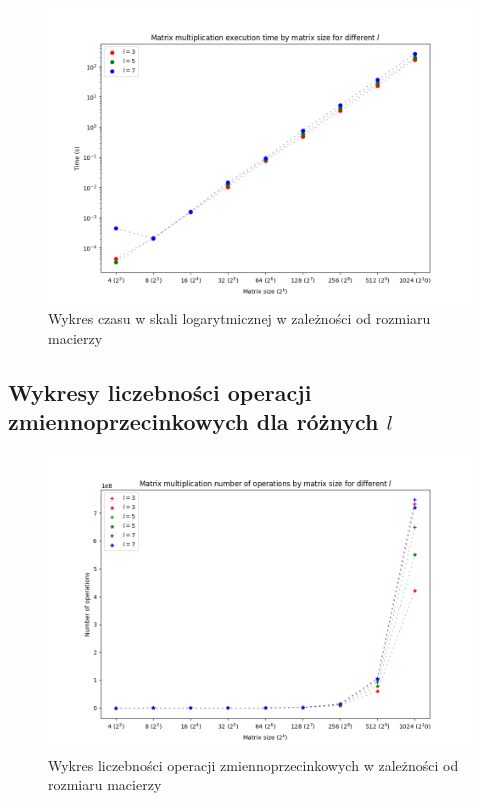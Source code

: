 \documentclass{article}
\begin{document}
\begin{figure}[h]
  \centering
  \includegraphics[scale=0.35]{log_time_scatter_plot.png}
  \caption{Wykres czasu w skali logarytmicznej w zależności od rozmiaru macierzy}
\end{figure}

\subsection{Wykresy liczebności operacji zmiennoprzecinkowych dla różnych $l$}

\begin{figure}
  \centering
  \includegraphics[width=\linewidth]{linear_operations_counter_scatter_plot.png}
  \caption{Wykres liczebności operacji zmiennoprzecinkowych w zależności od rozmiaru macierzy}
\end{figure}
\end{document}
